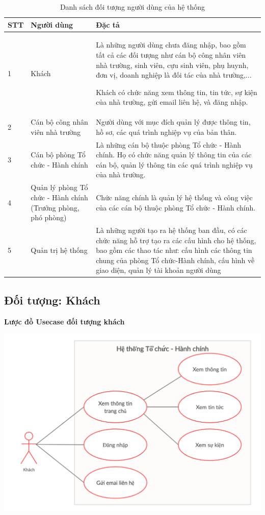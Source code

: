 \begin{table}[H]
    \centering
	\begin{tabular}{|p{1cm}|p{4cm}|p{10cm}|}
    \hline
    \textbf{STT}&\textbf{Người dùng}&\textbf{Đặc tả}\\
    \hline
    1&Khách&Là những người dùng chưa đăng nhập, bao gồm tất cả các đối tượng như cán bộ công nhân viên nhà trường, sinh viên, cựu sinh viên, phụ huynh, đơn vị, doanh nghiệp là đối tác của nhà trường,...
    
    Khách có chức năng xem thông tin, tin tức, sự kiện của nhà trường, gửi email liên hệ, và đăng nhập.\\
    \hline
	2&Cán bộ công nhân viên nhà trường&Người dùng với mục đích quản lý được thông tin, hồ sơ, các quá trình nghiệp vụ của bản thân.\\
	\hline
    3&Cán bộ phòng Tổ chức - Hành chính&Là những cán bộ thuộc phòng Tổ chức - Hành chính. Họ có chức năng quản lý thông tin của các cán bộ, quản lý thông tin các quá trình nghiệp vụ của nhà trường.\\
    \hline
    4&Quản lý phòng Tổ chức - Hành chính (Trưởng phòng, phó phòng) &Chức năng chính là quản lý hệ thống và công việc của các cán bộ thuộc phòng Tổ chức - Hành chính. \\
	\hline
    5&Quản trị hệ thống&Là những người tạo ra hệ thống ban đầu, có các chức năng hỗ trợ tạo ra các cấu hình cho hệ thống, bao gồm các thao tác như: cấu hình các thông tin chung của phòng Tổ chức-Hành chính, cấu hình về giao diện, quản lý tài khoản người dùng\\
	\hline
\end{tabular}
\caption{Danh sách đối tượng người dùng của hệ thống}
\end{table}
\subsection{Đối tượng: Khách}
\textbf{Lược đồ Usecase đối tượng khách}
\begin{center}
  \captionsetup{type=figure}
  \includegraphics[width=14cm]{img/usecase/guest.png}
\end{center}

